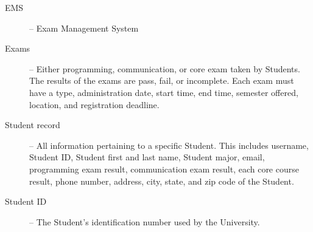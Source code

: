 
\begin{description}
   \item[EMS] -- Exam Management System 
   \item[Exams] --  Either programming, communication, or core exam taken by Students.
      The results of the exams are pass, fail, or incomplete. Each exam must
      have a type, administration date, start time, end time, semester offered,
      location, and registration deadline.
   \item[Student record] --  All information pertaining to a specific Student. This
      includes username, Student ID, Student first and last name, Student major,
      email, programming exam result, communication exam result, each core
      course result, phone number, address, city, state, and zip code of the
      Student.
   \item[Student ID] -- The Student's identification number used by the University.
\end{description}
